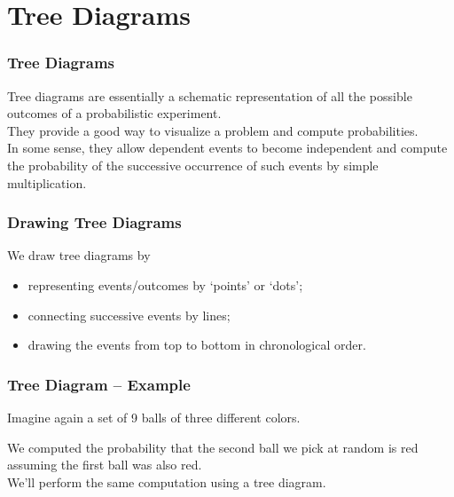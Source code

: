 \documentclass[aspectratio=169,11pt,usenames,dvipsnames,handout]{beamer}
\newcommand{\clr}{\textcolor{BrickRed}}
\begin{document}
\section{Tree Diagrams}

\begin{frame}
 \frametitle{Tree Diagrams}
 \alert{Tree diagrams} are essentially a schematic representation of all the
 possible outcomes of a probabilistic experiment.\\
 \pause
 They provide a good way to visualize a problem and compute probabilities.\\
 \pause
 In some sense, they allow \alert{dependent events} to \alert{become
 independent} and compute the probability of the successive occurrence of such
 events by simple multiplication.
\end{frame}

\begin{frame}
 \frametitle{Drawing Tree Diagrams}
 We draw tree diagrams by
 \begin{itemize}
  \item representing events/outcomes by `points' or `dots';
  \pause
  \item connecting successive events by lines;
   \pause
  \item drawing the events from top to bottom in chronological order.
 \end{itemize}
\end{frame}

\begin{frame}
 \frametitle{Tree Diagram -- Example}
 Imagine again a set of 9 balls of three different colors.
 \begin{center}
 \end{center}
 \pause
 We computed the probability that the \alert{second} ball we pick at random is
 \clr{red} assuming the first ball was also \clr{red}.\\
 \pause
 We'll perform the same computation using a \alert{tree diagram}.
\end{frame}
\end{document}

